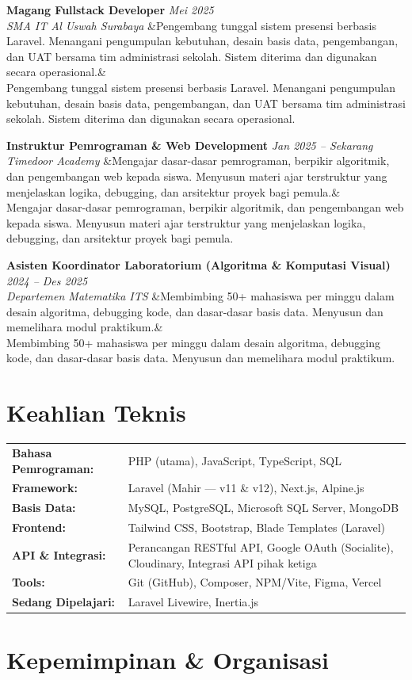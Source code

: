 \documentclass[a4paper,11pt]{article}
\newcommand{\cventry}[4]{%
  \noindent\textbf{#1} \hfill \textit{#3} \\
  \textit{#2}
  \ifx&#4& \else \\ \small #4 \fi
  \vspace{6pt}
}
\begin{document}
\cventry
  {Magang Fullstack Developer}
  {SMA IT Al Uswah Surabaya}
  {Mei 2025}
  {Pengembang tunggal sistem presensi berbasis Laravel. Menangani pengumpulan kebutuhan, desain basis data, pengembangan, dan UAT bersama tim administrasi sekolah. Sistem diterima dan digunakan secara operasional.}

\cventry
  {Instruktur Pemrograman \& Web Development}
  {Timedoor Academy}
  {Jan 2025 -- Sekarang}
  {Mengajar dasar-dasar pemrograman, berpikir algoritmik, dan pengembangan web kepada siswa. Menyusun materi ajar terstruktur yang menjelaskan logika, debugging, dan arsitektur proyek bagi pemula.}

\cventry
  {Asisten Koordinator Laboratorium (Algoritma \& Komputasi Visual)}
  {Departemen Matematika ITS}
  {2024 -- Des 2025}
  {Membimbing 50+ mahasiswa per minggu dalam desain algoritma, debugging kode, dan dasar-dasar basis data. Menyusun dan memelihara modul praktikum.}

\section{Keahlian Teknis}

\begin{tabularx}{\textwidth}{@{}l X@{}}
\textbf{Bahasa Pemrograman:} & PHP (utama), JavaScript, TypeScript, SQL \\[3pt]
\textbf{Framework:} & Laravel (Mahir --- v11 \& v12), Next.js, Alpine.js \\[3pt]
\textbf{Basis Data:} & MySQL, PostgreSQL, Microsoft SQL Server, MongoDB \\[3pt]
\textbf{Frontend:} & Tailwind CSS, Bootstrap, Blade Templates (Laravel) \\[3pt]
\textbf{API \& Integrasi:} & Perancangan RESTful API, Google OAuth (Socialite), Cloudinary, Integrasi API pihak ketiga \\[3pt]
\textbf{Tools:} & Git (GitHub), Composer, NPM/Vite, Figma, Vercel \\[3pt]
\textbf{Sedang Dipelajari:} & Laravel Livewire, Inertia.js \\
\end{tabularx}

\section{Kepemimpinan \& Organisasi}
\end{document}
